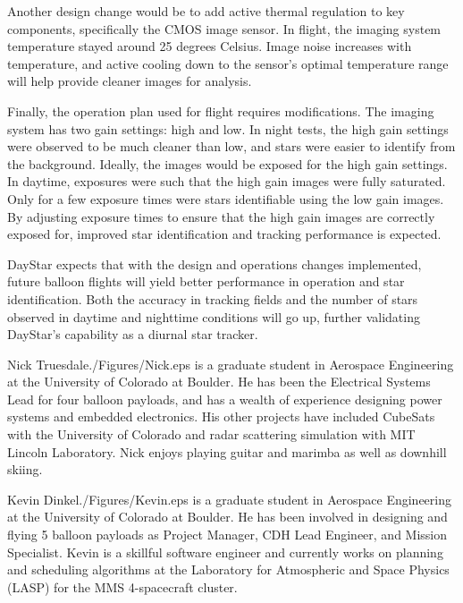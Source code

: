\documentclass[twocolumn,letterpaper]{IEEEAerospace2012}
\newcommand{\rootdir}{./Figures/}
\begin{document}
Another design change would be to add active thermal regulation to key components, specifically the CMOS image sensor. In flight, the imaging system temperature stayed around 25 degrees Celsius. Image noise increases with temperature, and active cooling down to the sensor's optimal temperature range will help provide cleaner images for analysis.

Finally, the operation plan used for flight requires modifications. The imaging system has two gain settings: high and low. In night tests, the high gain settings were observed to be much cleaner than low, and stars were easier to identify from the background. Ideally, the images would be exposed for the high gain settings. In daytime, exposures were such that the high gain images were fully saturated. Only for a few exposure times were stars identifiable using the low gain images. By adjusting exposure times to ensure that the high gain images are correctly exposed for, improved star identification and tracking performance is expected.

DayStar expects that with the design and operations changes implemented, future balloon flights will yield better performance in operation and star identification. Both the accuracy in tracking fields and the number of stars observed in daytime and nighttime conditions will go up, further validating DayStar's capability as a diurnal star tracker.




\thebiography
\begin{biographywithpic}{Nick Truesdale}{\rootdir Nick.eps}
is a graduate student in Aerospace Engineering at the University of Colorado at Boulder.
He has been the Electrical Systems Lead for four balloon payloads, and has a wealth of experience designing power systems and embedded electronics. His other projects have included CubeSats with the University of Colorado and radar scattering simulation with MIT Lincoln Laboratory. Nick enjoys playing guitar and marimba as well as downhill skiing.
\end{biographywithpic}

\begin{biographywithpic} {Kevin Dinkel}{\rootdir Kevin.eps}
is a graduate student in Aerospace Engineering at the University of Colorado at Boulder. He has been involved in designing and flying 5 balloon payloads as Project Manager, CDH Lead Engineer, and Mission Specialist. Kevin is a skillful software engineer and currently works on planning and scheduling algorithms at the Laboratory for Atmospheric and Space Physics (LASP) for the MMS 4-spacecraft cluster.
\end{biographywithpic}
\end{document}
